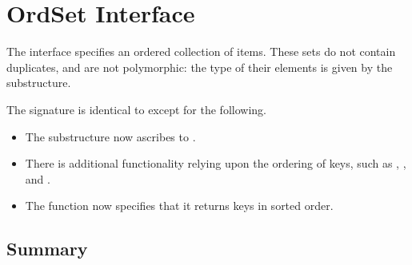 \chapter{OrdSet Interface}
\label{ch:ordset-interface}

\begin{cluster}
\label{grp:grm:ordset-interface::ordset}

\begin{gram}
\label{grm:ordset-interface::ordset}
\label{ch:ordset-interface}
\begin{preamble}
The  interface specifies an ordered collection of items. These sets
do not contain duplicates, and are not polymorphic: the type of their
elements is given by the  substructure.
\end{preamble}

\end{gram}
\end{cluster}

\begin{cluster}
\label{grp:nt:ordset-interface::ordset}

\begin{note}
\label{nt:ordset-interface::ordset}
The  signature is identical to  except for the following.
\begin{itemize}
  \item The  substructure now ascribes to .
  \item There is additional functionality relying upon the ordering of keys,
  such as , , and .
  \item The  function now specifies that it returns keys in sorted order.
\end{itemize}

\end{note}
\end{cluster}


\section{Summary}
\label{sec:ordset-interface::summary}

